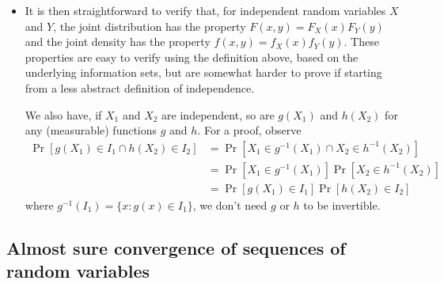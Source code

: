 \begin{itemize}
\item It is then straightforward to verify that, for independent
  random variables $X$ and $Y$, the joint distribution has the
  property $F(x, y) = F_X(x) F_Y(y)$ and the joint density has the
  property $f(x,y) = f_X(x) f_Y(y)$.  These properties are easy to
  verify using the definition above, based on the underlying
  information sets, but are somewhat harder to prove if starting from
  a less abstract definition of independence.

  We also have, if $X_1$ and $X_2$ are independent, so are $g(X_1)$ and
  $h(X_2)$ for any (measurable) functions $g$ and $h$.  For a proof,
  observe
  \begin{align*}
    \Pr[g(X_1) \in I_1 \cap h(X_2) \in I_2]
    &= \Pr[X_1 \in g^{-1}(X_1) \cap X_2 \in h^{-1}(X_2)] \\
    &= \Pr[X_1 \in g^{-1}(X_1)] \Pr[X_2 \in h^{-1}(X_2)] \\
    &= \Pr[g(X_1) \in I_1] \Pr[h(X_2) \in I_2]
  \end{align*}
  where $g^{-1}(I_1) = \{x : g(x) \in I_1\}$, we don't need $g$ or $h$ to
  be invertible.

\end{itemize}

\subsection{Almost sure convergence of sequences of random variables}

